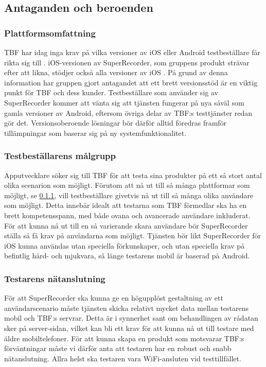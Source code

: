 \subsection{Antaganden och beroenden}
\label{subsec:assumptions}

\subsubsection{Plattformsomfattning}
\label{subsubsec:plattformsomfattning}
TBF har idag inga krav på vilka versioner av iOS eller Android testbeställare får rikta sig till \parencite{betafaq}. iOS-versionen av SuperRecorder, som gruppens produkt strävar efter att likna, stödjer också alla versioner av iOS \parencite{superrec}. På grund av denna information har gruppen gjort antagandet att ett brett versionsstöd är en viktig punkt för TBF och dess kunder. Testbeställare som använder sig av SuperRecorder kommer att vänta sig att tjänsten fungerar på nya såväl som gamla versioner av Android, eftersom övriga delar av TBF:s testtjänster redan gör det. Versionsoberoende lösningar bör därför alltid föredras framför tillämpningar som baserar sig på ny systemfunktionalitet.

\subsubsection{Testbeställarens målgrupp}
Apputvecklare söker sig till TBF för att testa sina produkter på ett så stort antal olika scenarion som möjligt. Förutom att nå ut till så många plattformar som möjligt, se \ref{subsubsec:plattformsomfattning}, vill testbeställare givetvis nå ut till så många olika användare som möjligt. Detta innebär idealt att testarna som TBF förmedlar ska ha en brett kompetensspann, med både ovana och avancerade användare inkluderat. För att kunna nå ut till en så varierande skara användare bör SuperRecorder ställa så få krav på användarna som möjligt. Tjänsten bör likt SuperRecorder för iOS kunna användas utan speciella förkunskaper, och utan speciella krav på befintlig hård- och mjukvara, så länge testarens mobil är baserad på Android.

\subsubsection{Testarens nätanslutning}
För att SuperRecorder ska kunna ge en högupplöst gestaltning av ett användarscenario måste tjänsten skicka relativt mycket data mellan testarens mobil och TBF:s servrar. Detta är i synnerhet sant om behandlingen av rådatan sker på server-sidan, vilket kan bli ett krav för att kunna nå ut till testare med äldre mobiltelefoner. För att kunna skapa en produkt som motsvarar TBF:s förväntningar måste vi därför anta att testaren har en robust och snabb nätanslutning. Allra helst ska testaren vara WiFi-ansluten vid testtillfället.

